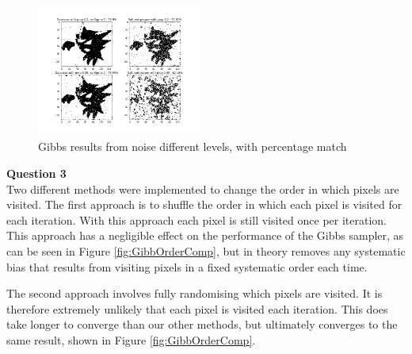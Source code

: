 \documentclass[10pt, a4paper, twocolumn]{article} %
\begin{document}
\begin{figure}
    \centering
    \includegraphics[width=0.48\textwidth]{images/GibbGridDifferentLevels.png}
    \caption{Gibbs results from noise different levels, with percentage match}
    \label{fig:GibbDifferentLevels}
\end{figure}

\noindent\textbf{Question 3} \\
Two different methods were implemented to change the order in which pixels are visited. The first approach is to shuffle the order in which each pixel is visited for each iteration. With this approach each pixel is still visited once per iteration. This approach has a negligible effect on the performance of the Gibbs sampler, as can be seen in Figure \ref{fig:GibbOrderComp}, but in theory removes any systematic bias that results from visiting pixels in a fixed systematic order each time.

The second approach involves fully randomising which pixels are visited. It is therefore extremely unlikely that each pixel is visited each iteration. This does take longer to converge than our other methods, but ultimately converges to the same result, shown in Figure \ref{fig:GibbOrderComp}.
\end{document}
